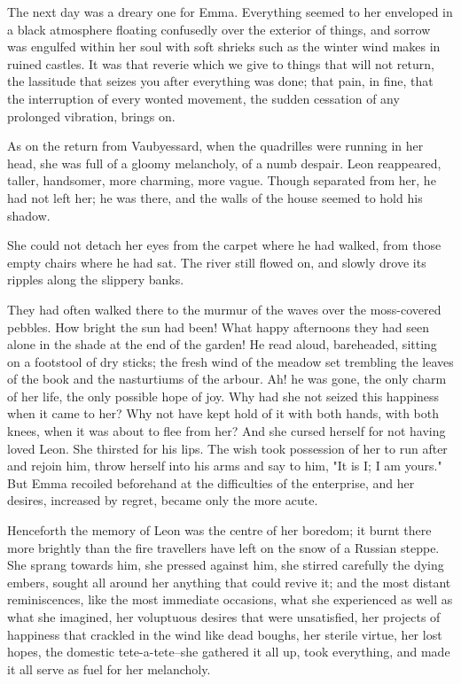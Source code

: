 \documentclass{tufte-book}
\begin{document}
The next day was a dreary one for Emma. Everything seemed to her
enveloped in a black atmosphere floating confusedly over the exterior of
things, and sorrow was engulfed within her soul with soft shrieks such
as the winter wind makes in ruined castles. It was that reverie which we
give to things that will not return, the lassitude that seizes you after
everything was done; that pain, in fine, that the interruption of every
wonted movement, the sudden cessation of any prolonged vibration, brings
on.

As on the return from Vaubyessard, when the quadrilles were running in
her head, she was full of a gloomy melancholy, of a numb despair.
Leon reappeared, taller, handsomer, more charming, more vague. Though
separated from her, he had not left her; he was there, and the walls of
the house seemed to hold his shadow.

She could not detach her eyes from the carpet where he had walked, from
those empty chairs where he had sat. The river still flowed on, and
slowly drove its ripples along the slippery banks.

They had often walked there to the murmur of the waves over the
moss-covered pebbles. How bright the sun had been! What happy afternoons
they had seen alone in the shade at the end of the garden! He read
aloud, bareheaded, sitting on a footstool of dry sticks; the fresh wind
of the meadow set trembling the leaves of the book and the nasturtiums
of the arbour. Ah! he was gone, the only charm of her life, the only
possible hope of joy. Why had she not seized this happiness when it came
to her? Why not have kept hold of it with both hands, with both knees,
when it was about to flee from her? And she cursed herself for not
having loved Leon. She thirsted for his lips. The wish took possession
of her to run after and rejoin him, throw herself into his arms and
say to him, "It is I; I am yours." But Emma recoiled beforehand at the
difficulties of the enterprise, and her desires, increased by regret,
became only the more acute.

Henceforth the memory of Leon was the centre of her boredom; it burnt
there more brightly than the fire travellers have left on the snow of
a Russian steppe. She sprang towards him, she pressed against him, she
stirred carefully the dying embers, sought all around her anything
that could revive it; and the most distant reminiscences, like the most
immediate occasions, what she experienced as well as what she imagined,
her voluptuous desires that were unsatisfied, her projects of happiness
that crackled in the wind like dead boughs, her sterile virtue, her
lost hopes, the domestic tete-a-tete--she gathered it all up, took
everything, and made it all serve as fuel for her melancholy.
\end{document}
